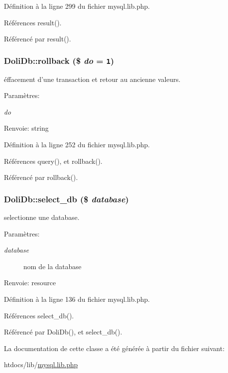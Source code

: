 D\'{e}finition \`{a} la ligne 299 du fichier mysql.lib.php.

R\'{e}f\'{e}rences result().

R\'{e}f\'{e}renc\'{e} par result().\hypertarget{classDoliDb_a9}{
\subsubsection[rollback]{\setlength{\rightskip}{0pt plus 5cm}Doli\-Db::rollback (\$ {\em do} = {\tt 1})}}
\label{classDoliDb_a9}


\'{e}ffacement d'une transaction et retour au ancienne valeurs. 

\begin{Desc}
\item[Param\`{e}tres:]
\begin{description}
\item[{\em do}]\end{description}
\end{Desc}
\begin{Desc}
\item[Renvoie:]string \end{Desc}


D\'{e}finition \`{a} la ligne 252 du fichier mysql.lib.php.

R\'{e}f\'{e}rences query(), et rollback().

R\'{e}f\'{e}renc\'{e} par rollback().\hypertarget{classDoliDb_a1}{
\subsubsection[select\_\-db]{\setlength{\rightskip}{0pt plus 5cm}Doli\-Db::select\_\-db (\$ {\em database})}}
\label{classDoliDb_a1}


selectionne une database. 

\begin{Desc}
\item[Param\`{e}tres:]
\begin{description}
\item[{\em database}]nom de la database \end{description}
\end{Desc}
\begin{Desc}
\item[Renvoie:]resource \end{Desc}


D\'{e}finition \`{a} la ligne 136 du fichier mysql.lib.php.

R\'{e}f\'{e}rences select\_\-db().

R\'{e}f\'{e}renc\'{e} par Doli\-Db(), et select\_\-db().

La documentation de cette classe a \'{e}t\'{e} g\'{e}n\'{e}r\'{e}e \`{a} partir du fichier suivant:\begin{CompactItemize}
\item 
htdocs/lib/\hyperlink{mysql_8lib_8php}{mysql.lib.php}\end{CompactItemize}
